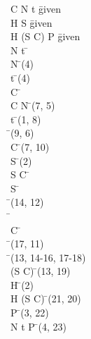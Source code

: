 \documentclass{article}
\begin{document}
\begin{proofbox}
\: C \land N \rightarrow t \= \hbox{given} \\
\: H \land \lnot S \= \hbox{given} \\
\: H \land \lnot (S \lor C) \rightarrow P \= \hbox{given} \\
\open
\: N \land \lnot t \= \asm \\
\: N \= \andelim(4) \\
\: \lnot t \= \andelim(4) \\
\open
\: C \= \asm \\
\: C \land N \= \andintro(7, 5) \\
\: t \= \implieselim(1, 8) \\
\: \bot \= \bottomintro(9, 6) \\
\close
\: \lnot C \= \notintro(7, 10) \\
\: \lnot S \= \andelim(2) \\
\open
\: S \lor C \= \asm \\
\openAlt
\: S \= \asm \\
\: \bot \= \bottomintro(14, 12) \\
\: \bot \=  \\
\splitAlt
\: C \= \asm \\
\: \bot \= \bottomintro(17, 11) \\
\closeAlt
\: \bot \= \orelim(13, 14-16, 17-18) \\
\close
\: \lnot (S \lor C) \= \notintro(13, 19) \\
\: H \= \andelim(2) \\
\: H \land \lnot (S \lor C) \= \andintro(21, 20) \\
\: P \= \implieselim(3, 22) \\
\close
\: N \land \lnot t \rightarrow P \= \impliesintro(4, 23) \\
\end{proofbox}
\end{document}
